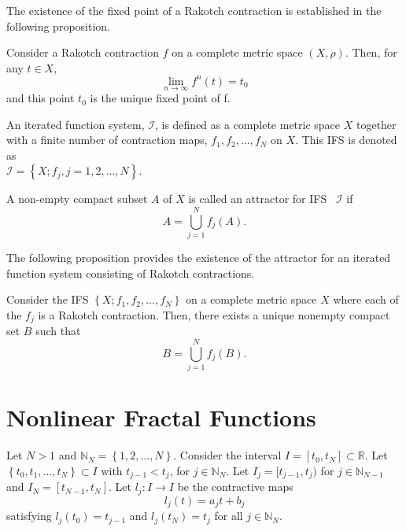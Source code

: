 \documentclass[sn-mathphys-num]{sn-jnl}
\numberwithin{equation}{section}
\begin{document}
\noindent The existence of the fixed point of a Rakotch contraction is established in the following proposition.
\begin{proposition}\label{rfp}
\cite{drakopoulos2021generalised} Consider a Rakotch contraction $f$ on a complete metric space $(X,\rho)$. Then, for any $t\in X$,
\begin{equation}
\lim_{n\rightarrow\infty} f^n(t)=t_0\nonumber
\end{equation} 
and this point $t_0$ is the unique fixed point of f.
\end{proposition}
\begin{definition}
    \cite{barnsley2014fractals}An iterated function system, $\mathcal{I}$, is defined as a complete metric space $X$ together with a finite number of contraction maps, $f_1,f_2,\ldots,f_N$ on $X$. This IFS is denoted as\\ $\mathcal{I}=\left\{X;f_j, j=1, 2,\ldots, N\right\}$.
\end{definition}
\begin{definition}[Attractor]
    \cite{barnsley2014fractals} A non-empty compact subset $A$ of $X$ is called an attractor for IFS ~$\mathcal{I}$ if
    \begin{equation*}
        A=\bigcup_{j=1}^N f_j(A).
    \end{equation*}
\end{definition}
\noindent The following proposition provides the existence of the attractor for an iterated function system consisting of Rakotch contractions.
\begin{proposition}
\cite{drakopoulos2021generalised} 
Consider the IFS $\left\{X;f_1, f_2, \dots, f_N\right\}$ on a complete metric space $X$ where each of the $f_j$ is a Rakotch contraction. Then, there exists a unique nonempty compact set $B$ such that
\begin{equation*}
B=\bigcup\limits_{j=1}^{N}f_j(B).
\end{equation*} 
\end{proposition}
\section{Nonlinear Fractal Functions}\label{Nonlinear fractal functions}

Let $N>1$ and $\mathbb{N}_N=\left\{1,2,\ldots, N\right\}$. Consider the interval $I=[t_0,t_N]\subset\mathbb{R}$. Let $\left\{t_0,t_1,\dots ,t_N\right\}\subset I$ with $t_{j-1}<t_j$, for $j\in \mathbb{N}_N$. Let $I_j=[t_{j-1},t_j)$ for $j\in \mathbb 
{N}_{N-1}$ and $I_N=[t_{N-1},t_N]$. Let $l_j:I\rightarrow I$ be the contractive maps 
\begin{equation}
l_j(t)=a_jt+b_j  \label{l_j}
\end{equation}
satisfying $l_j(t_0)=t_{j-1} $ and $l_j(t_N)=t_j$ for all $j\in\mathbb N_N$.
\end{document}
